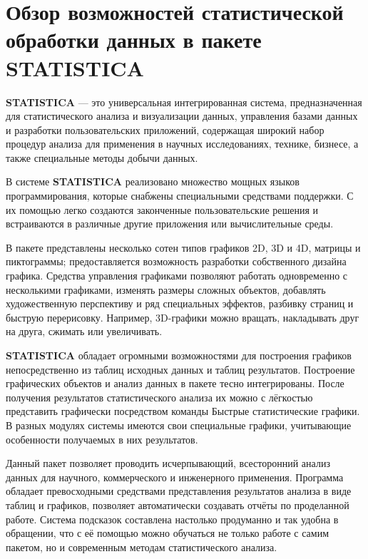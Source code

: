 \newpage

\chapter{Обзор возможностей статистической обработки данных в пакете \textbf{STATISTICA}}

\textbf{STATISTICA} — это универсальная интегрированная система, предназначенная для статистического анализа и визуализации данных, управления базами данных и разработки пользовательских приложений, содержащая широкий набор процедур анализа для применения в научных исследованиях, технике, бизнесе, а также специальные методы добычи данных.

В системе \textbf{STATISTICA} реализовано множество мощных языков программирования, которые снабжены специальными средствами поддержки. С их помощью легко создаются законченные пользовательские решения и встраиваются в различные другие приложения или вычислительные среды. 
 
В пакете представлены несколько сотен типов графиков 2D, 3D и 4D, матрицы и пиктограммы; предоставляется возможность разработки собственного дизайна графика. Средства управления графиками позволяют работать одновременно с несколькими графиками, изменять размеры сложных объектов, добавлять художественную перспективу и ряд специальных эффектов, разбивку страниц и быструю перерисовку. Например, 3D-графики можно вращать, накладывать друг на друга, сжимать или увеличивать.

\textbf{STATISTICA} обладает огромными возможностями для построения графиков непосредственно из таблиц исходных данных и таблиц результатов. Построение графических объектов и анализ данных в пакете тесно интегрированы. После получения результатов статистического анализа их можно с лёгкостью представить графически посредством команды Быстрые статистические графики. В разных модулях системы имеются свои специальные графики, учитывающие особенности получаемых в них результатов.

Данный пакет позволяет проводить исчерпывающий, всесторонний анализ данных для научного, коммерческого и инженерного применения. Программа обладает превосходными средствами представления результатов анализа в виде таблиц и графиков, позволяет автоматически создавать отчёты по проделанной работе. Система подсказок составлена настолько продуманно и так удобна в обращении, что с её помощью можно обучаться не только работе с самим пакетом, но и современным методам статистического анализа.